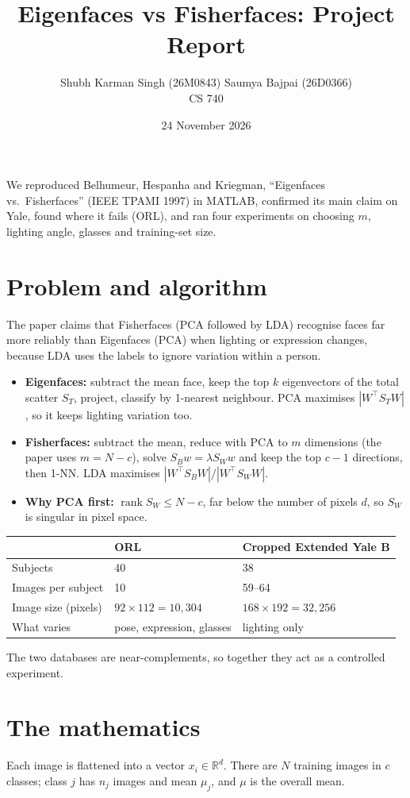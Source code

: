 \documentclass[11pt]{article}
\title{\textbf{Eigenfaces vs Fisherfaces: Project Report}}
\author{Shubh Karman Singh (26M0843) \quad Saumya Bajpai (26D0366)\\CS 740}
\date{24 November 2026}
\newcommand{\T}{^{\top}}
\begin{document}
\maketitle

We reproduced Belhumeur, Hespanha and Kriegman, ``Eigenfaces vs.\ Fisherfaces'' (IEEE TPAMI 1997) in MATLAB, confirmed its main claim on Yale, found where it fails (ORL), and ran four experiments on choosing $m$, lighting angle, glasses and training-set size.

\section{Problem and algorithm}
The paper claims that Fisherfaces (PCA followed by LDA) recognise faces far more reliably than Eigenfaces (PCA) when lighting or expression changes, because LDA uses the labels to ignore variation within a person.
\begin{itemize}
\item \textbf{Eigenfaces:} subtract the mean face, keep the top $k$ eigenvectors of the total scatter $S_T$, project, classify by 1-nearest neighbour. PCA maximises $|W\T S_T W|$, so it keeps lighting variation too.
\item \textbf{Fisherfaces:} subtract the mean, reduce with PCA to $m$ dimensions (the paper uses $m=N-c$), solve $S_B w=\lambda S_W w$ and keep the top $c-1$ directions, then 1-NN. LDA maximises $|W\T S_B W|/|W\T S_W W|$.
\item \textbf{Why PCA first:} $\operatorname{rank} S_W\le N-c$, far below the number of pixels $d$, so $S_W$ is singular in pixel space.
\end{itemize}
\begin{center}
\begin{tabular}{lll}\toprule
 & ORL & Cropped Extended Yale B\\\midrule
Subjects & 40 & 38\\
Images per subject & 10 & 59--64\\
Image size (pixels) & $92\times112=10{,}304$ & $168\times192=32{,}256$\\
What varies & pose, expression, glasses & lighting only\\\bottomrule
\end{tabular}
\end{center}
The two databases are near-complements, so together they act as a controlled experiment.

\section{The mathematics}
Each image is flattened into a vector $x_i\in\mathbb R^d$. There are $N$ training images in $c$ classes; class $j$ has $n_j$ images and mean $\mu_j$, and $\mu$ is the overall mean.
\end{document}

